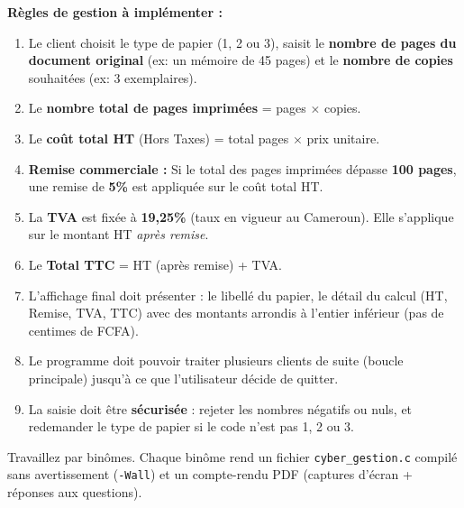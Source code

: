 \documentclass[11pt]{article}
\newcounter{popsec}
\newcounter{popsub}
\newcommand{\courssub}[1]{%
  \stepcounter{popsub}%
  \par\vspace{9pt}\noindent{\popxbold\fontsize{11.5}{13}\selectfont\color{popink}{\color{poporange}\thepopsec.\thepopsub}\hspace{6pt}#1}\par\nopagebreak\vspace{4pt}
}
\begin{document}
\begin{exemplebox}
\medskip
\textbf{Règles de gestion à implémenter :}
\begin{enumerate}
    \item Le client choisit le type de papier (1, 2 ou 3), saisit le \textbf{nombre de pages du document original} (ex: un mémoire de 45 pages) et le \textbf{nombre de copies} souhaitées (ex: 3 exemplaires).
    \item Le \textbf{nombre total de pages imprimées} = pages $\times$ copies.
    \item Le \textbf{coût total HT} (Hors Taxes) = total pages $\times$ prix unitaire.
    \item \textbf{Remise commerciale :} Si le total des pages imprimées dépasse \textbf{100 pages}, une remise de \textbf{5\%} est appliquée sur le coût total HT.
    \item La \textbf{TVA} est fixée à \textbf{19,25\%} (taux en vigueur au Cameroun). Elle s'applique sur le montant HT \emph{après remise}.
    \item Le \textbf{Total TTC} = HT (après remise) + TVA.
    \item L'affichage final doit présenter : le libellé du papier, le détail du calcul (HT, Remise, TVA, TTC) avec des montants arrondis à l'entier inférieur (pas de centimes de FCFA).
    \item Le programme doit pouvoir traiter plusieurs clients de suite (boucle principale) jusqu'à ce que l'utilisateur décide de quitter.
    \item La saisie doit être \textbf{sécurisée} : rejeter les nombres négatifs ou nuls, et redemander le type de papier si le code n'est pas 1, 2 ou 3.
\end{enumerate}
\end{exemplebox}

\courssub{Consignes}
Travaillez par binômes. Chaque binôme rend un fichier \texttt{cyber\_gestion.c} compilé sans avertissement (\texttt{-Wall}) et un compte-rendu PDF (captures d'écran + réponses aux questions).
\end{document}
